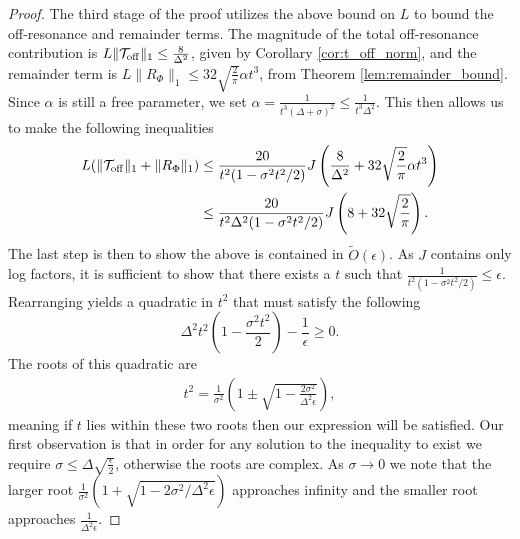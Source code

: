 \documentclass{article}
\newcommand{\off}{\rm off}
\newcommand{\norm}[1]{\| #1 \|}
\newcommand{\bigotilde}[1]{\widetilde{O} \left( #1 \right)}
\begin{document}
\begin{proof}
 The third stage of the proof utilizes the above bound on $L$ to bound the  off-resonance and remainder terms. The magnitude of the total off-resonance contribution is $L \norm{\mathcal{T}_{\off}}_1 \le \frac{8 }{\Delta^2}$, given by Corollary \ref{cor:t_off_norm}, and the remainder term is $L \norm{R_{\Phi}}_1 \le 32 \sqrt{\frac{2}{\pi}} \alpha t^3$, from Theorem \ref{lem:remainder_bound}. %
 Since $\alpha$ is still a free parameter, we %
 set $\alpha = \frac{1}{t^3(\Delta + \sigma)^2} \le \frac{1}{t^3 \Delta^2}$. This then allows us to make the following inequalities
 \begin{align}
     L(\norm{\mathcal{T}_{\off}}_1 + \norm{R_{\Phi}}_1) &\le \frac{20}{t^2(1 - \sigma^2 t^2 / 2)}J \left( \frac{8}{\Delta^2} + 32 \sqrt{\frac{2}{\pi}} \alpha t^3 \right) \\
    &\le \frac{20}{t^2 \Delta^2 (1 - \sigma^2 t^2 / 2)}J \left( 8 + 32 \sqrt{\frac{2}{\pi}}\right). \label{eq:single_qubit_tmp_2}
 \end{align}
The last step is then to show the above is contained in $\bigotilde{\epsilon}$. As $J$ contains only log factors, it is sufficient to show that there exists a $t$ such that $\frac{1}{t^2(1 - \sigma^2 t^2 / 2)} \le \epsilon$. Rearranging yields a quadratic in $t^2$ that must satisfy the following
\begin{equation}
    \Delta^2 t^2 \left(1 - \frac{\sigma^2 t^2}{2}\right) - \frac{1}{\epsilon} \ge 0. \label{eq:single_qubit_tmp_3}
\end{equation}
The roots of this quadratic are
\begin{align}
    t^2 = \frac{1}{\sigma^2}\left(1 \pm \sqrt{1 - \frac{2 \sigma^2}{\Delta^2 \epsilon}} \right),
\end{align}
meaning if $t$ lies within these two roots then our expression will be satisfied. Our first observation is that in order for any solution to the inequality to exist we require $\sigma \le \Delta \sqrt{\frac{\epsilon}{2}}$, otherwise the roots are complex. As $\sigma \to 0$ we note that the larger root $\frac{1}{\sigma^2}(1 + \sqrt{1 - 2 \sigma^2 / \Delta^2 \epsilon})$ approaches infinity and the smaller root approaches $\frac{1}{\Delta^2 \epsilon}$.


\end{proof}
\end{document}
